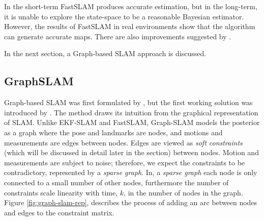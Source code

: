 In the short-term FastSLAM produces accurate estimation, but in the long-term, it is unable to explore the state-space to be a reasonable Bayesian estimator\cite{Bailey2006c}. However, the results of FastSLAM in real environments show that the algorithm can generate accurate maps\cite{Stachnissa, Stachniss2005, Balage2010, Nieto2003}. There are also improvements suggested by \cite{Liu2012, Hahnel2003, Hahnel2005}.

In the next section, a Graph-based SLAM approach is discussed.
\subsection{GraphSLAM}
Graph-based SLAM was first formulated by \cite{Smith1986, 768}, but the first working solution was introduced by \cite{Lu1997}. The method draws its intuition from the graphical representation of SLAM. Unlike EKF-SLAM and FastSLAM, Graph-SLAM models the posterior as a graph where the pose and landmarks are nodes, and motions and measurements are edges between nodes. Edges are viewed as \textit{soft constraints} (which will be discussed in detail later in the section) between nodes. Motion and measurements are subject to noise; therefore, we expect the constraints to be contradictory, represented by a \textit{sparse graph}. In, a \textit{sparse graph} each node is only connected to a small number of other nodes, furthermore the number of constraints scale linearity with time, $k$, in the number of nodes in the graph. Figure \ref{fig:graph-slam-rep}, describes the process of adding an arc between nodes and edges to the constraint matrix\cite{Thrun2006}. 

